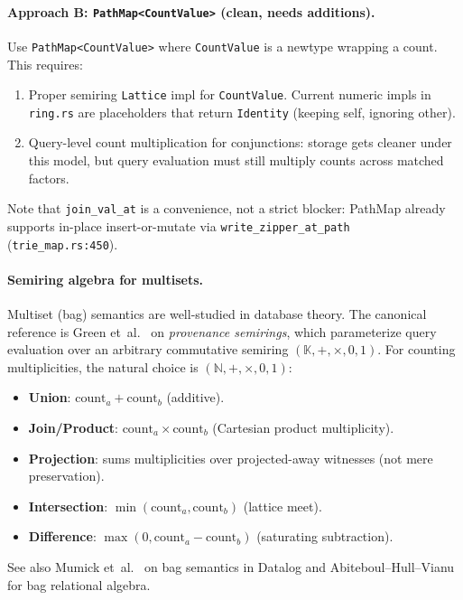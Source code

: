\documentclass[11pt]{article}
\newcommand{\code}[1]{\texttt{#1}}
\newcommand{\PathMap}{\textup{PathMap}}
\begin{document}
\paragraph{Approach B: \code{PathMap<CountValue>} (clean, needs additions).}
Use \code{PathMap<CountValue>} where \code{CountValue} is a newtype
wrapping a count.  This requires:
\begin{enumerate}[nosep]
  \item Proper semiring \code{Lattice} impl for \code{CountValue}.
    Current numeric impls in \code{ring.rs} are placeholders that return
    \code{Identity} (keeping self, ignoring other).
  \item Query-level count multiplication for conjunctions: storage gets
    cleaner under this model, but query evaluation must still multiply
    counts across matched factors.
\end{enumerate}
Note that \code{join\_val\_at} is a convenience, not a strict blocker:
\PathMap{} already supports in-place insert-or-mutate via
\code{write\_zipper\_at\_path} (\code{trie\_map.rs:450}).

\paragraph{Semiring algebra for multisets.}
Multiset (bag) semantics are well-studied in database theory.  The
canonical reference is Green et~al.~\cite{GreenProvenanceSemirings2007}
on \emph{provenance semirings}, which parameterize query evaluation over
an arbitrary commutative semiring $(\mathbb{K}, +, \times, 0, 1)$.
For counting multiplicities, the natural choice is $(\mathbb{N}, +, \times,
0, 1)$:
\begin{itemize}[nosep]
  \item \textbf{Union}: $\text{count}_a + \text{count}_b$ (additive).
  \item \textbf{Join/Product}: $\text{count}_a \times \text{count}_b$
    (Cartesian product multiplicity).
  \item \textbf{Projection}: sums multiplicities over projected-away
    witnesses (not mere preservation).
  \item \textbf{Intersection}: $\min(\text{count}_a, \text{count}_b)$
    (lattice meet).
  \item \textbf{Difference}: $\max(0, \text{count}_a - \text{count}_b)$
    (saturating subtraction).
\end{itemize}
See also Mumick et~al.~\cite{MumickMagicDuplicates1990} on bag semantics
in Datalog and Abiteboul--Hull--Vianu~\cite{AHV1995} for bag relational
algebra.
\end{document}
